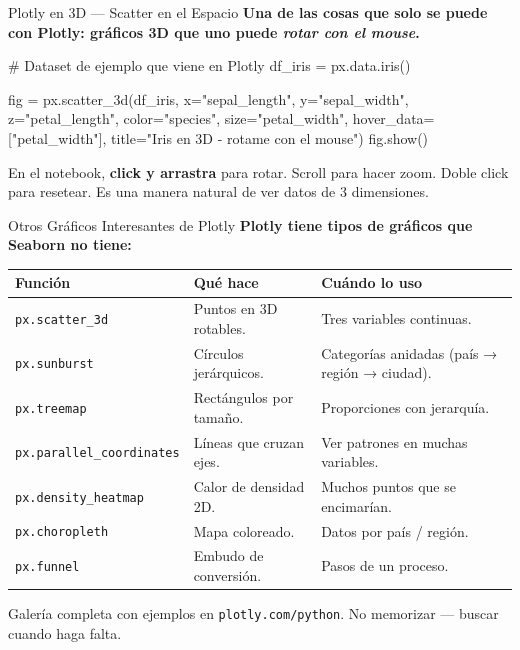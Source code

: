 \documentclass[aspectratio=169, 11pt]{beamer}
\begin{document}
\begin{frame}[fragile,shrink=18]{Plotly en 3D --- Scatter en el Espacio}
  \vspace{-4pt}
  {\footnotesize\color{arcaDark}\bfseries
    Una de las cosas que \textbf{solo} se puede con Plotly: gráficos 3D
    que uno puede \textit{rotar con el mouse}.}

  \vspace{4pt}
  \begin{pyblock}
# Dataset de ejemplo que viene en Plotly
df_iris = px.data.iris()

fig = px.scatter_3d(df_iris,
    x="sepal_length", y="sepal_width", z="petal_length",
    color="species",
    size="petal_width",
    hover_data=["petal_width"],
    title="Iris en 3D - rotame con el mouse")
fig.show()
  \end{pyblock}

  \vspace{2pt}
  {\scriptsize\color{textMuted}
    \faMousePointer\hspace{4pt} En el notebook, \textbf{click y arrastra}
    para rotar. Scroll para hacer zoom. Doble click para resetear.
    Es una manera natural de ver datos de 3 dimensiones.}
\end{frame}

\begin{frame}[shrink=10]{Otros Gráficos Interesantes de Plotly}
  \vspace{-4pt}
  {\footnotesize\color{arcaDark}\bfseries
    Plotly tiene tipos de gráficos que Seaborn \textbf{no tiene}:}

  \vspace{6pt}
  {\scriptsize
  \begin{tabular}{@{}lp{4.5cm}p{5cm}@{}}
    \toprule
    \textbf{Función} & \textbf{Qué hace} & \textbf{Cuándo lo uso} \\
    \midrule
    \texttt{px.scatter\_3d} & Puntos en 3D rotables. & Tres variables continuas. \\
    \texttt{px.sunburst} & Círculos jerárquicos. & Categorías anidadas (país → región → ciudad). \\
    \texttt{px.treemap} & Rectángulos por tamaño. & Proporciones con jerarquía. \\
    \texttt{px.parallel\_coordinates} & Líneas que cruzan ejes. & Ver patrones en muchas variables. \\
    \texttt{px.density\_heatmap} & Calor de densidad 2D. & Muchos puntos que se encimarían. \\
    \texttt{px.choropleth} & Mapa coloreado. & Datos por país / región. \\
    \texttt{px.funnel} & Embudo de conversión. & Pasos de un proceso. \\
    \bottomrule
  \end{tabular}
  }

  \vspace{6pt}
  {\scriptsize\color{textMuted}
    \faLightbulb\hspace{4pt} Galería completa con ejemplos en
    \texttt{plotly.com/python}. No memorizar --- buscar cuando haga falta.}
\end{frame}
\end{document}
